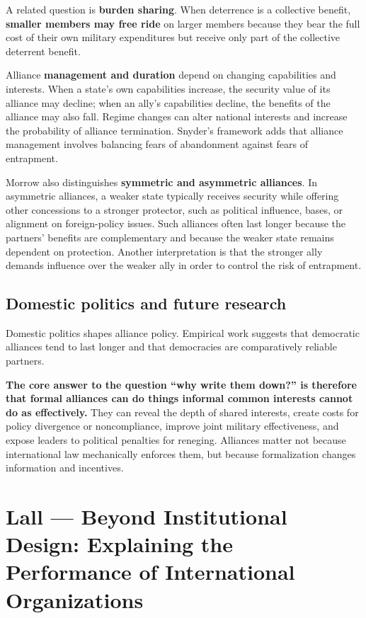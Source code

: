 A related question is \textbf{burden sharing}. When deterrence is a collective benefit, \textbf{smaller members may free ride} on larger members because they bear the full cost of their own military expenditures but receive only part of the collective deterrent benefit.

Alliance \textbf{management and duration} depend on changing capabilities and interests. When a state's own capabilities increase, the security value of its alliance may decline; when an ally's capabilities decline, the benefits of the alliance may also fall. Regime changes can alter national interests and increase the probability of alliance termination. Snyder's framework adds that alliance management involves balancing fears of abandonment against fears of entrapment.

Morrow also distinguishes \textbf{symmetric and asymmetric alliances}. In asymmetric alliances, a weaker state typically receives security while offering other concessions to a stronger protector, such as political influence, bases, or alignment on foreign-policy issues. Such alliances often last longer because the partners' benefits are complementary and because the weaker state remains dependent on protection. Another interpretation is that the stronger ally demands influence over the weaker ally in order to control the risk of entrapment.

\subsection{Domestic politics and future research}

Domestic politics shapes alliance policy. Empirical work suggests that democratic alliances tend to last longer and that democracies are comparatively reliable partners.

\textbf{The core answer to the question ``why write them down?'' is therefore that formal alliances can do things informal common interests cannot do as effectively.} They can reveal the depth of shared interests, create costs for policy divergence or noncompliance, improve joint military effectiveness, and expose leaders to political penalties for reneging. Alliances matter not because international law mechanically enforces them, but because formalization changes information and incentives.

\clearpage
\section{Lall --- Beyond Institutional Design: Explaining the Performance of International Organizations}

